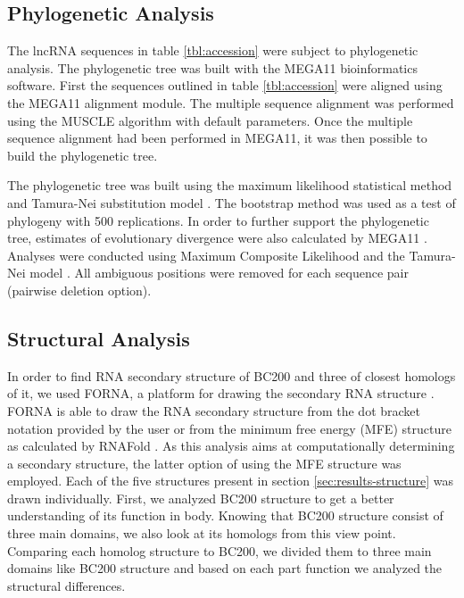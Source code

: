 \documentclass[conference, 11pt]{IEEEtran}
\begin{document}
\subsection{Phylogenetic Analysis}\label{sec:phylo}

The lncRNA sequences in table \ref{tbl:accession} were subject to phylogenetic analysis.
The phylogenetic tree was built with the MEGA11 \cite{tamura2021mega11} bioinformatics software. 
First the sequences outlined in table \ref{tbl:accession} were aligned using the MEGA11 alignment module. 
The multiple sequence alignment was performed using the MUSCLE algorithm with default parameters. 
Once the multiple sequence alignment had been performed in MEGA11, it was then possible to build the phylogenetic tree. 

The phylogenetic tree was built using the maximum likelihood statistical method and Tamura-Nei substitution model \cite{tamura1993estimation, tamura2004prospects}. 
The bootstrap method was used as a test of phylogeny with 500 replications.
In order to further support the phylogenetic tree, estimates of evolutionary divergence were also calculated by MEGA11 \cite{tamura2021mega11}. 
Analyses were conducted using Maximum Composite Likelihood and the Tamura-Nei model \cite{tamura1993estimation, tamura2004prospects}. 
All ambiguous positions were removed for each sequence pair (pairwise deletion option). 

\subsection{Structural Analysis}\label{sec:structure}

In order to find RNA secondary structure of BC200 and three of closest homologs of it, we used FORNA, a platform for drawing the secondary RNA structure \cite{kerpedjiev2015forna}. 
FORNA is able to draw the RNA secondary structure from the dot bracket notation provided by the user or from the minimum free energy (MFE) structure as calculated by RNAFold \cite{lorenz2011viennarna}. 
As this analysis aims at computationally determining a secondary structure, the latter option of using the MFE structure was employed. 
Each of the five structures present in section \ref{sec:results-structure} was drawn individually. 
First, we analyzed BC200 structure to get a better understanding of its function in body. 
Knowing that BC200 structure consist of three main domains, we also look at its homologs from this view point. 
Comparing each homolog structure to BC200, we divided them to three main domains like BC200 structure and based on each part function we analyzed the structural differences.
\end{document}
